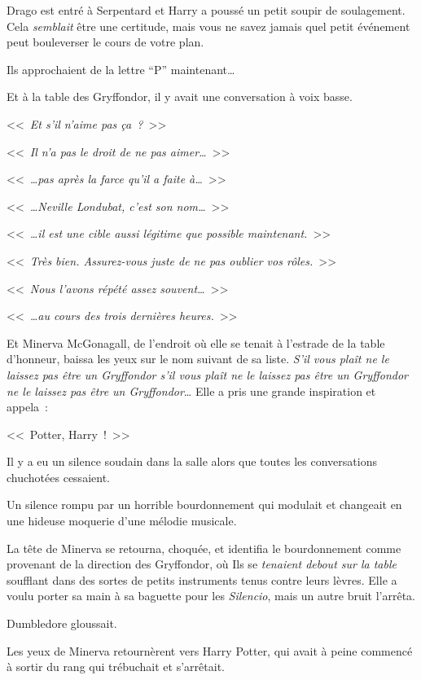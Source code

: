 \later

Drago est entré à Serpentard et Harry a poussé un petit soupir de soulagement. Cela \emph{semblait} être une certitude, mais vous ne savez jamais quel petit événement peut bouleverser le cours de votre plan.

Ils approchaient de la lettre “P” maintenant…

Et à la table des Gryffondor, il y avait une conversation à voix basse.

<<~\emph{Et s'il n'aime pas ça~?}~>>

<<~\emph{Il n'a pas le droit de ne pas aimer…}~>>

<<~\emph{…pas après la farce qu'il a faite à…}~>>

<<~\emph{…Neville Londubat, c'est son nom…}~>>

<<~\emph{…il est une cible aussi légitime que possible maintenant.}~>>

<<~\emph{Très bien. Assurez-vous juste de ne pas oublier vos rôles.}~>>

<<~\emph{Nous l'avons répété assez souvent…}~>>

<<~\emph{…au cours des trois dernières heures.}~>>

Et Minerva McGonagall, de l'endroit où elle se tenait à l'estrade de la table d'honneur, baissa les yeux sur le nom suivant de sa liste. \emph{S'il vous plaît ne le laissez pas être un Gryffondor s'il vous plaît ne le laissez pas être un Gryffondor  ne le laissez pas être un Gryffondor}… Elle a pris une grande inspiration et appela~:

<<~Potter, Harry~!~>>

Il y a eu un silence soudain dans la salle alors que toutes les conversations chuchotées cessaient.

Un silence rompu par un horrible bourdonnement qui modulait et changeait en une hideuse moquerie d'une mélodie musicale.

La tête de Minerva se retourna, choquée, et identifia le bourdonnement comme provenant de la direction des Gryffondor, où Ils se \emph{tenaient debout sur la table} soufflant dans des sortes de petits instruments tenus contre leurs lèvres. Elle a voulu porter sa main à sa baguette pour les \emph{Silencio}, mais un autre bruit l'arrêta.

Dumbledore gloussait.

Les yeux de Minerva retournèrent vers Harry Potter, qui avait à peine commencé à sortir du rang qui trébuchait et s'arrêtait.

